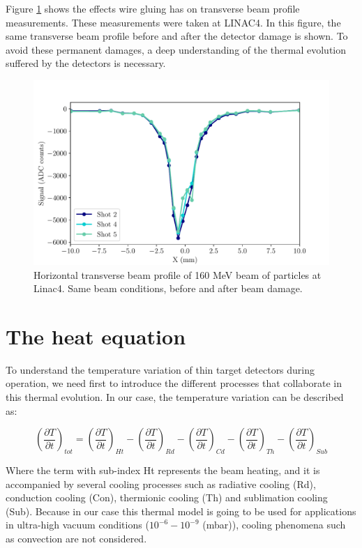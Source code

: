 Figure \ref{fig:WireGluing} shows the effects wire gluing has on transverse beam profile measurements. These measurements were taken at LINAC4. In this figure, the same transverse beam profile before and after the detector damage is shown. To avoid these permanent damages, a deep understanding of the thermal evolution suffered by the detectors is necessary. 

\begin{figure}[h]
    \centering
    \includegraphics[width=0.60\columnwidth]{Figure_WiresGluing/WireProfile.pdf}
    \caption{Horizontal transverse beam profile of 160 MeV beam of particles at Linac4. Same beam conditions, before and after beam damage. }
    \label{fig:WireGluing}
\end{figure}



\section{The heat equation}

To understand the temperature variation of thin target detectors during operation, we need first to introduce the different processes that collaborate in this thermal evolution. In our case, the temperature variation can be described as: 

\begin{equation}
    \left(\frac{\partial T}{\partial t}\right)_{tot} = \left(\frac{\partial T}{\partial t}\right)_{Ht} - \left(\frac{\partial T}{\partial t}\right)_{Rd} - 
                 \left(\frac{\partial T}{\partial t}\right)_{Cd} - \left(\frac{\partial T}{\partial t}\right)_{Th} - \left(\frac{\partial T}{\partial t}\right)_{Sub}
    \label{eq:HeatBalance}
\end{equation}

Where the term with sub-index Ht represents the beam heating, and it is accompanied by several cooling processes such as radiative cooling (Rd), conduction cooling (Con), thermionic cooling (Th) and sublimation cooling (Sub). Because in our case this thermal model is going to be used for applications in ultra-high vacuum conditions ($10^{-6} - 10^{-9}$ (mbar)), cooling phenomena such as convection are not considered. 

